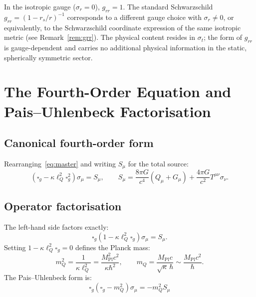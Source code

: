 \documentclass[11pt,a4paper]{article}
\theoremstyle{plain}
\theoremstyle{definition}
\theoremstyle{remark}
\newcommand{\rs}{r_s}
\newcommand{\lQ}{\ell_Q}
\newcommand{\mQ}{m_Q}
\newcommand{\Mpl}{M_{\mathrm{Pl}}}
\newcommand{\boxg}{\square_g}
\begin{document}
In the isotropic gauge ($\sigma_r = 0$), $g_{rr} = 1$.  The standard Schwarzschild
$g_{rr} = (1-\rs/r)^{-1}$ corresponds to a different gauge choice with $\sigma_r \ne 0$,
or equivalently, to the Schwarzschild coordinate expression of the same isotropic metric
(see Remark~\ref{rem:grr}).  The physical content resides in $\sigma_t$; the form of
$g_{rr}$ is gauge-dependent and carries no additional physical information in the static,
spherically symmetric sector.

\section{The Fourth-Order Equation and Pais--Uhlenbeck Factorisation}
\label{sec:PU}

\subsection{Canonical fourth-order form}

Rearranging~\eqref{eq:master} and writing $S_\mu$ for the total source:
\begin{equation}
  \boxed{(\boxg - \kappa\lQ^2\boxg^2)\sigma_\mu = S_\mu},
  \qquad
  S_\mu = \frac{8\pi G}{c^4}(Q_\mu + G_\mu) + \frac{4\pi G}{c^2}T^{\mu\nu}\sigma_\nu.
  \label{eq:fourth}
\end{equation}

\subsection{Operator factorisation}

The left-hand side factors exactly:
\begin{equation}
  \boxg(1 - \kappa\lQ^2\boxg)\sigma_\mu = S_\mu.
  \label{eq:factor}
\end{equation}
Setting $1 - \kappa\lQ^2\boxg = 0$ defines the Planck mass:
\begin{equation}
  \mQ^2 = \frac{1}{\kappa\lQ^2} = \frac{\Mpl^2 c^2}{\kappa\hbar^2},
  \qquad \mQ = \frac{\Mpl c}{\sqrt{\kappa}\,\hbar} \sim \frac{\Mpl c^2}{\hbar}.
  \label{eq:mQ}
\end{equation}
The Pais--Uhlenbeck form is:
\begin{equation}
  \boxed{\boxg(\boxg - \mQ^2)\sigma_\mu = -\mQ^2 S_\mu}
  \label{eq:PU}
\end{equation}
\end{document}
